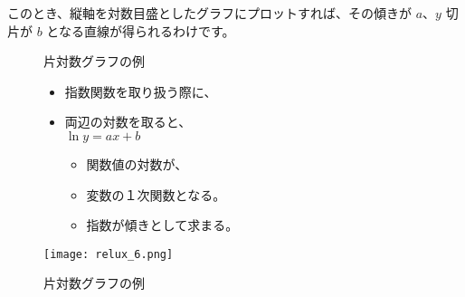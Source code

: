 \documentclass[uplatex,dvipdfmx,a4paper,11pt]{jsarticle}
\begin{document}
このとき、縦軸を対数目盛としたグラフにプロットすれば、その傾きが $a$、$y$ 切片が $b$ となる直線が得られるわけです。

\begin{figure}[htb]
	\begin{center}
		\begin{minipage}{0.45\textwidth}
			\large
			\begin{itembox}[l]{片対数グラフの例}
				\begin{itemize}
					\item 指数関数を取り扱う際に、
					\item 両辺の対数を取ると、\\
					$\ln y = ax + b$
					\begin{itemize}
						\item 関数値の対数が、
						\item 変数の１次関数となる。
						\item 指数が傾きとして求まる。
					\end{itemize}
				\end{itemize}
			\end{itembox}
		\end{minipage}
		\begin{minipage}{0.45\textwidth}
			\begin{center}
			\texttt{[image: relux\_6.png]}
			\end{center}
		\end{minipage}
		\caption{片対数グラフの例}
		\label{fig:semilog}
	\end{center}
\end{figure}
\end{document}
